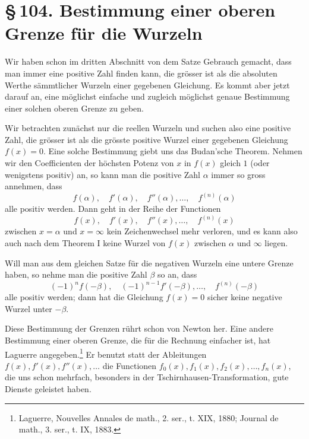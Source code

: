 \documentclass[11pt]{article}
\providecommand{\sect}[2]{\section*{\S\,#1. #2}}
\begin{document}
\sect{104}{Bestimmung einer oberen Grenze für die Wurzeln}

Wir haben schon im dritten Abschnitt von dem Satze Gebrauch gemacht, dass man immer eine positive Zahl finden kann, die grösser ist als die absoluten Werthe sämmtlicher Wurzeln einer gegebenen Gleichung. Es kommt aber jetzt darauf an, eine möglichst einfache und zugleich möglichst genaue Bestimmung einer solchen oberen Grenze zu geben.

Wir betrachten zunächst nur die reellen Wurzeln und suchen also eine positive Zahl, die grösser ist als die grösste positive Wurzel einer gegebenen Gleichung $f(x)=0$. Eine solche Bestimmung giebt uns das Budan'sche Theorem. Nehmen wir den Coefficienten der höchsten Potenz von $x$ in $f(x)$ gleich $1$ (oder wenigstens positiv) an, so kann man die positive Zahl $\alpha$ immer so gross annehmen, dass
\begin{equation}
        f(\alpha),\quad f'(\alpha),\quad f''(\alpha),\ldots,\quad f^{(n)}(\alpha)
\tag{1}
\end{equation}
alle positiv werden. Dann geht in der Reihe der Functionen
\[
        f(x),\quad f'(x),\quad f''(x),\ldots,\quad f^{(n)}(x)
\]
zwischen $x=\alpha$ und $x=\infty$ kein Zeichenwechsel mehr verloren, und es kann also auch nach dem Theorem I keine Wurzel von $f(x)$ zwischen $\alpha$ und $\infty$ liegen.

Will man aus dem gleichen Satze für die negativen Wurzeln eine untere Grenze haben, so nehme man die positive Zahl $\beta$ so an, dass
\begin{equation}
        (-1)^n f(-\beta),\quad (-1)^{n-1}f'(-\beta),\ldots,\quad f^{(n)}(-\beta)
\tag{2}
\end{equation}
alle positiv werden; dann hat die Gleichung $f(x)=0$ sicher keine negative Wurzel unter $-\beta$.

Diese Bestimmung der Grenzen rührt schon von Newton her. Eine andere Bestimmung einer oberen Grenze, die für die Rechnung einfacher ist, hat Laguerre angegeben.\footnote{Laguerre, Nouvelles Annales de math., 2. ser., t. XIX, 1880; Journal de math., 3. ser., t. IX, 1883.} Er benutzt statt der Ableitungen $f(x),f'(x),f''(x),\ldots$ die Functionen $f_0(x),f_1(x),f_2(x),\ldots,f_n(x)$, die uns schon mehrfach, besonders in der Tschirnhausen-Transformation, gute Dienste geleistet haben.
\end{document}
